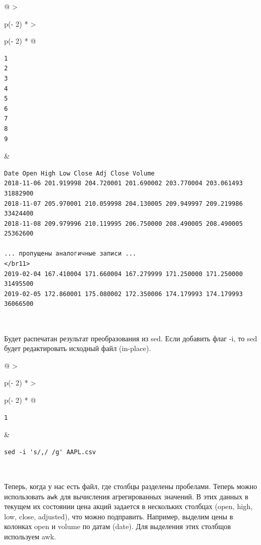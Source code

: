\documentclass{report}
\begin{document}
\begin{longtable}[]{@{}
  >{\raggedright\arraybackslash}p{(\columnwidth - 2\tabcolsep) * }
  >{\raggedright\arraybackslash}p{(\columnwidth - 2\tabcolsep) * }@{}}
\toprule
\endhead
\begin{minipage}[t]{\linewidth}\raggedright
\begin{verbatim}
1
2
3
4
5
6
7
8
9
\end{verbatim}
\end{minipage} & \begin{minipage}[t]{\linewidth}\raggedright
\begin{verbatim}
Date Open High Low Close Adj Close Volume
2018-11-06 201.919998 204.720001 201.690002 203.770004 203.061493 31882900
2018-11-07 205.970001 210.059998 204.130005 209.949997 209.219986 33424400
2018-11-08 209.979996 210.119995 206.750000 208.490005 208.490005 25362600

... пропущены аналогичные записи ...
</br11>
2019-02-04 167.410004 171.660004 167.279999 171.250000 171.250000 31495500
2019-02-05 172.860001 175.080002 172.350006 174.179993 174.179993 36066500
\end{verbatim}
\end{minipage} \\ \addlinespace
\bottomrule
\end{longtable}

Будет распечатан результат преобразования из sed. Если добавить флаг -i,
то sed будет редактировать исходный файл (in-place).

\begin{longtable}[]{@{}
  >{\raggedright\arraybackslash}p{(\columnwidth - 2\tabcolsep) * }
  >{\raggedright\arraybackslash}p{(\columnwidth - 2\tabcolsep) * }@{}}
\toprule
\endhead
\begin{minipage}[t]{\linewidth}\raggedright
\begin{verbatim}
1
\end{verbatim}
\end{minipage} & \begin{minipage}[t]{\linewidth}\raggedright
\begin{verbatim}
sed -i 's/,/ /g' AAPL.csv
\end{verbatim}
\end{minipage} \\ \addlinespace
\bottomrule
\end{longtable}

Теперь, когда у нас есть файл, где столбцы разделены пробелами. Теперь
можно использовать \texttt{awk} для вычисления агрегированных значений.
В этих данных в текущем их состоянии цена акций задается в нескольких
столбцах (open, high, low, close, adjusted), что можно подправить.
Например, выделим цены в колонках open и volume по датам (date). Для
выделения этих столбщов используем awk.
\end{document}
